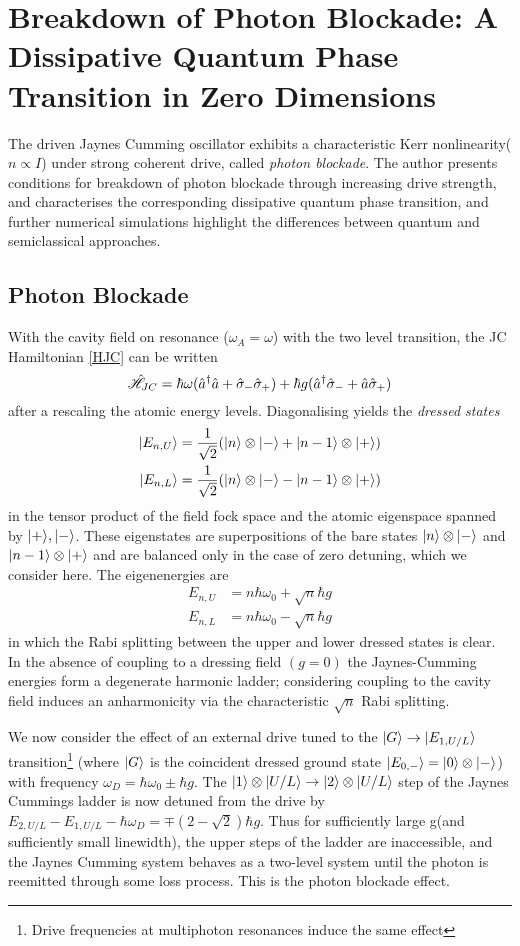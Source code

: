 \section{Breakdown of Photon Blockade: A Dissipative Quantum Phase Transition in Zero Dimensions}
The driven Jaynes Cumming oscillator exhibits a characteristic Kerr nonlinearity($n \propto I$) under strong coherent drive, called \emph{photon blockade}\autocite{Carmichael2015}. The author presents conditions for breakdown of photon blockade through increasing drive strength, and characterises the corresponding dissipative quantum phase transition, and further numerical simulations highlight the differences between quantum and semiclassical approaches.
\subsection{Photon Blockade}
With the cavity field on resonance ($\omega_A = \omega$) with the two level transition, the JC Hamiltonian \ref{HJC} can be written\autocite[3]{Carmichael2015}
\begin{equation}
	\hat{\mathscr{H}}_{JC} = \hbar \omega (\hat{a}^\dagger \hat{a} + \hat{\sigma}_- \hat{\sigma}_+) +\hbar g (\hat{a}^\dagger \hat{\sigma}_- + \hat{a} \hat{\sigma}_+)
\end{equation}
after a rescaling the atomic energy levels. Diagonalising yields the \emph{dressed states}
\begin{align}
	| E_{n, U} \rangle & = \frac{1}{\sqrt{2}} (| n \rangle \otimes | - \rangle+| n-1 \rangle \otimes | + \rangle) \\
	| E_{n, L} \rangle & = \frac{1}{\sqrt{2}} (| n \rangle \otimes | - \rangle-| n-1 \rangle \otimes | + \rangle)
\end{align} 
in the tensor product of the field fock space and the atomic eigenspace spanned by $| + \rangle, | - \rangle$. These eigenstates are superpositions of the bare states $| n \rangle \otimes | - \rangle$ and $| n-1 \rangle \otimes | + \rangle$ and are balanced only in the case of zero detuning, which we consider here. The eigenenergies are 
\begin{align}
	E_{n, U} &= n \hbar \omega_0 + \sqrt{n} \hbar g \\
	E_{n, L} &= n \hbar \omega_0 - \sqrt{n} \hbar g
\end{align}
in which the Rabi splitting between the upper and lower dressed states is clear. In the absence of coupling to a dressing field $(g=0)$ the Jaynes-Cumming energies form a degenerate harmonic ladder; considering coupling to the cavity field induces an anharmonicity via the characteristic $\sqrt{n}$ Rabi splitting.

We now consider the effect of an external drive tuned to the $| G \rangle \rightarrow | E_{1, U/L} \rangle$ transition\footnote{Drive frequencies at multiphoton resonances induce the same effect} (where $| G \rangle$ is the coincident dressed ground state $| E_{0, -} \rangle = | 0 \rangle \otimes | - \rangle$) with frequency $\omega_D = \hbar \omega_0 \pm \hbar g$.
The $| 1 \rangle \otimes | U/L \rangle \rightarrow | 2 \rangle \otimes | U/L \rangle$ step of the Jaynes Cummings ladder is now detuned from the drive by $E_{2, U/L} - E_{1, U/L} - \hbar \omega_D =  \mp(2-\sqrt{2}) \hbar g$. Thus for sufficiently large g(and sufficiently small linewidth), the upper steps of the ladder are inaccessible, and the Jaynes Cumming system behaves as a two-level system until the photon is reemitted through some loss process. This is the photon blockade effect.

